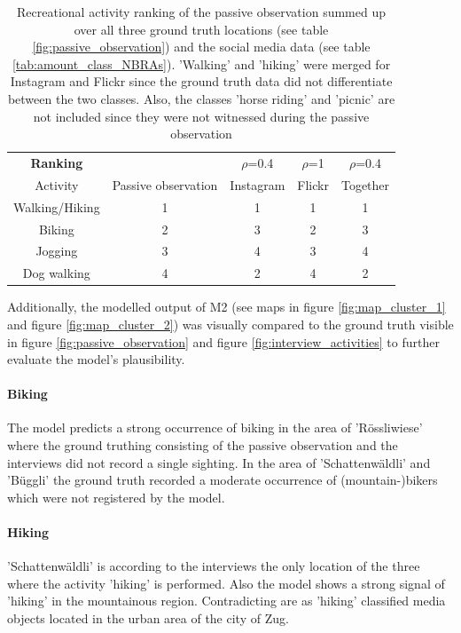 \begin{table}[!htb]
\begin{center}
\caption{Recreational activity ranking of the passive observation summed up over all three ground truth locations (see table \ref{fig:passive_observation}) and the social media data (see table \ref{tab:amount_class_NBRAs}). 'Walking' and 'hiking' were merged for Instagram and Flickr since the ground truth data did not differentiate between the two classes. Also, the classes 'horse riding' and 'picnic' are not included since they were not witnessed during the passive observation}\vspace{1ex}
\label{tab:compare_ranking}
\begin{tabular}{ccccc}\hline
\textbf{\large{Ranking}}  & & $\rho$=0.4 & $\rho$=1 & $\rho$=0.4\\
Activity & Passive observation & Instagram & Flickr & Together\footnotemark\\ \hline
Walking/Hiking & 1 & 1 & 1 & 1\\
Biking & 2 & 3 & 2 & 3 \\
Jogging & 3 & 4 & 3 & 4\\
Dog walking & 4 & 2 & 4 & 2 \\
\hline
\end{tabular}
\end{center}
\end{table}

Additionally, the modelled output of M2 (see maps in figure \ref{fig:map_cluster_1} and figure \ref{fig:map_cluster_2}) was visually compared to the ground truth visible in figure \ref{fig:passive_observation} and figure \ref{fig:interview_activities} to further evaluate the model's plausibility.

\paragraph*{Biking}
The model predicts a strong occurrence of biking in the area of 'R\"ossliwiese' where the ground truthing consisting of the passive observation and the interviews did not record a single sighting. In the area of 'Schattenw\"aldli' and 'B\"uggli' the ground truth recorded a moderate occurrence of (mountain-)bikers which were not registered by the model. 

\paragraph*{Hiking}
'Schattenw\"aldli' is according to the interviews the only location of the three where the activity 'hiking' is performed. Also the model shows a strong signal of 'hiking' in the mountainous region. Contradicting are as 'hiking' classified media objects located in the urban area of the city of Zug.

